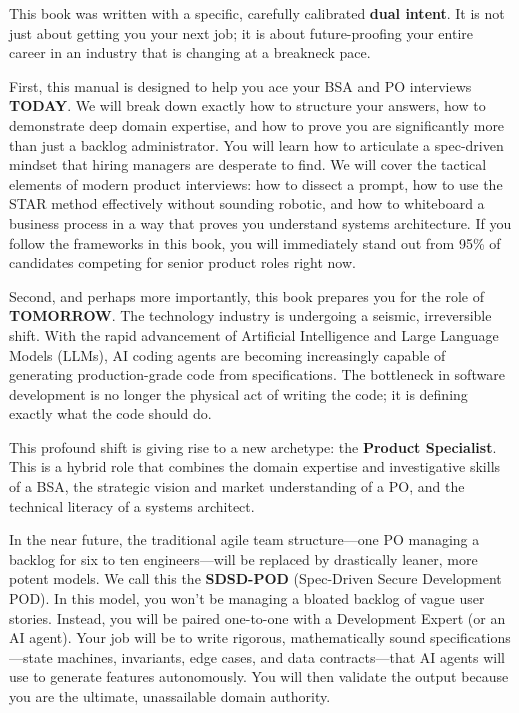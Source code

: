 This book was written with a specific, carefully calibrated \textbf{dual
intent}. It is not just about getting you your next job; it is about
future-proofing your entire career in an industry that is changing at a
breakneck pace.

First, this manual is designed to help you ace your BSA and PO
interviews \textbf{TODAY}. We will break down exactly how to structure
your answers, how to demonstrate deep domain expertise, and how to prove
you are significantly more than just a backlog administrator. You will
learn how to articulate a spec-driven mindset that hiring managers are
desperate to find. We will cover the tactical elements of modern product
interviews: how to dissect a prompt, how to use the STAR method
effectively without sounding robotic, and how to whiteboard a business
process in a way that proves you understand systems architecture. If you
follow the frameworks in this book, you will immediately stand out from
95\% of candidates competing for senior product roles right now.

Second, and perhaps more importantly, this book prepares you for the
role of \textbf{TOMORROW}. The technology industry is undergoing a
seismic, irreversible shift. With the rapid advancement of Artificial
Intelligence and Large Language Models (LLMs), AI coding agents are
becoming increasingly capable of generating production-grade code from
specifications. The bottleneck in software development is no longer the
physical act of writing the code; it is defining exactly what the code
should do.

This profound shift is giving rise to a new archetype: the
\textbf{Product Specialist}. This is a hybrid role that combines the
domain expertise and investigative skills of a BSA, the strategic vision
and market understanding of a PO, and the technical literacy of a
systems architect.

In the near future, the traditional agile team structure---one PO
managing a backlog for six to ten engineers---will be replaced by
drastically leaner, more potent models. We call this the
\textbf{SDSD-POD} (Spec-Driven Secure Development POD). In this model,
you won't be managing a bloated backlog of vague user stories. Instead,
you will be paired one-to-one with a Development Expert (or an AI
agent). Your job will be to write rigorous, mathematically sound
specifications---state machines, invariants, edge cases, and data
contracts---that AI agents will use to generate features autonomously.
You will then validate the output because you are the ultimate,
unassailable domain authority.

